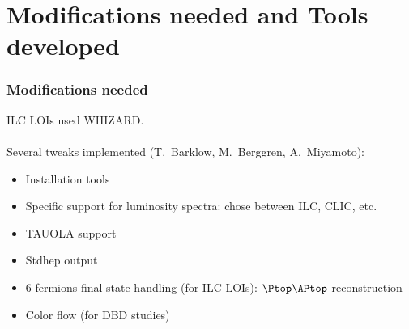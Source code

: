 \documentclass{beamer}
\newcommand{\whizard}{WHIZARD\xspace}
\begin{document}
\section{Modifications needed and Tools developed}
\begin{frame}
\frametitle{Modifications needed}
ILC LOIs used \whizard.\\
~\\
Several tweaks implemented (T.~Barklow, M.~Berggren, A.~Miyamoto):
\begin{itemize}
  \item Installation tools
  \item Specific support for luminosity spectra: chose between ILC, CLIC, etc.
  \item TAUOLA support
  \item Stdhep output
  \item 6 fermions final state handling (for ILC LOIs): $\Ptop\APtop$
  reconstruction
  \item Color flow (for DBD studies)
\end{itemize}
\end{frame}
\end{document}
